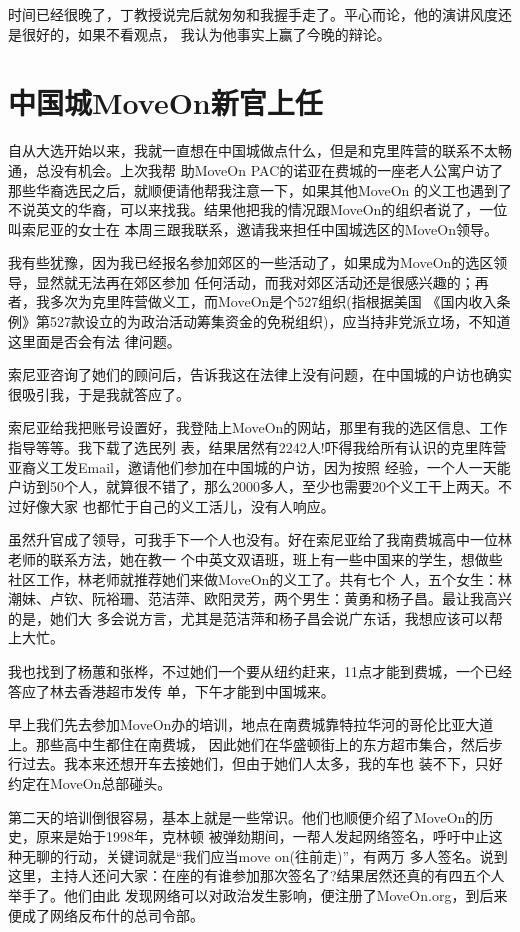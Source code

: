 ﻿\documentclass[11pt]{article}
\begin{document}
时间已经很晚了，丁教授说完后就匆匆和我握手走了。平心而论，他的演讲风度还是很好的，如果不看观点，
我认为他事实上赢了今晚的辩论。

\section{中国城MoveOn新官上任}

自从大选开始以来，我就一直想在中国城做点什么，但是和克里阵营的联系不太畅通，总没有机会。上次我帮
助MoveOn PAC的诺亚在费城的一座老人公寓户访了那些华裔选民之后，就顺便请他帮我注意一下，如果其他MoveOn
的义工也遇到了不说英文的华裔，可以来找我。结果他把我的情况跟MoveOn的组织者说了，一位叫索尼亚的女士在
本周三跟我联系，邀请我来担任中国城选区的MoveOn领导。

我有些犹豫，因为我已经报名参加郊区的一些活动了，如果成为MoveOn的选区领导，显然就无法再在郊区参加
任何活动，而我对郊区活动还是很感兴趣的；再者，我多次为克里阵营做义工，而MoveOn是个527组织(指根据美国
《国内收入条例》第527款设立的为政治活动筹集资金的免税组织)，应当持非党派立场，不知道这里面是否会有法
律问题。

索尼亚咨询了她们的顾问后，告诉我这在法律上没有问题，在中国城的户访也确实很吸引我，于是我就答应了。

索尼亚给我把账号设置好，我登陆上MoveOn的网站，那里有我的选区信息、工作指导等等。我下载了选民列
表，结果居然有2242人!吓得我给所有认识的克里阵营亚裔义工发Email，邀请他们参加在中国城的户访，因为按照
经验，一个人一天能户访到50个人，就算很不错了，那么2000多人，至少也需要20个义工干上两天。不过好像大家
也都忙于自己的义工活儿，没有人响应。

虽然升官成了领导，可我手下一个人也没有。好在索尼亚给了我南费城高中一位林老师的联系方法，她在教一
个中英文双语班，班上有一些中国来的学生，想做些社区工作，林老师就推荐她们来做MoveOn的义工了。共有七个
人，五个女生：林潮妹、卢钦、阮裕珊、范洁萍、欧阳灵芳，两个男生：黄勇和杨子昌。最让我高兴的是，她们大
多会说方言，尤其是范洁萍和杨子昌会说广东话，我想应该可以帮上大忙。

我也找到了杨蕙和张桦，不过她们一个要从纽约赶来，11点才能到费城，一个已经答应了林去香港超市发传
单，下午才能到中国城来。

早上我们先去参加MoveOn办的培训，地点在南费城靠特拉华河的哥伦比亚大道上。那些高中生都住在南费城，
因此她们在华盛顿街上的东方超市集合，然后步行过去。我本来还想开车去接她们，但由于她们人太多，我的车也
装不下，只好约定在MoveOn总部碰头。

第二天的培训倒很容易，基本上就是一些常识。他们也顺便介绍了MoveOn的历史，原来是始于1998年，克林顿
被弹劾期间，一帮人发起网络签名，呼吁中止这种无聊的行动，关键词就是``我们应当move on(往前走)''，有两万
多人签名。说到这里，主持人还问大家：在座的有谁参加那次签名了?结果居然还真的有四五个人举手了。他们由此
发现网络可以对政治发生影响，便注册了MoveOn.org，到后来便成了网络反布什的总司令部。
\end{document}
